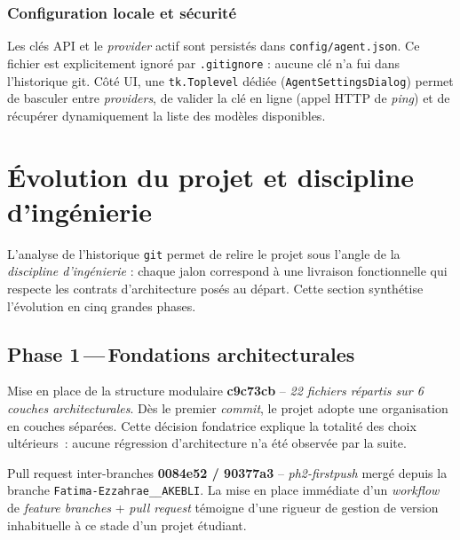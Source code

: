 \documentclass[11pt,a4paper]{report}
\begin{document}
\subsection{Configuration locale et s\'ecurit\'e}

Les cl\'es API et le \textit{provider} actif sont persist\'es dans
\texttt{config/agent.json}. Ce fichier est explicitement ignor\'e
par \texttt{.gitignore} : aucune cl\'e n'a fui dans l'historique
git. C\^ot\'e UI, une \texttt{tk.Toplevel} d\'edi\'ee
(\texttt{AgentSettingsDialog}) permet de basculer entre
\textit{providers}, de valider la cl\'e en ligne (appel HTTP de
\textit{ping}) et de r\'ecup\'erer dynamiquement la liste des
mod\`eles disponibles.

\chapter{\'Evolution du projet et discipline d'ing\'enierie}

L'analyse de l'historique \texttt{git} permet de relire le projet
sous l'angle de la \textit{discipline d'ing\'enierie} : chaque jalon
correspond \`a une livraison fonctionnelle qui respecte les
contrats d'architecture pos\'es au d\'epart. Cette section synth\'etise
l'\'evolution en cinq grandes phases.

\section{Phase 1\,---\,Fondations architecturales}

\begin{milestonebox}{Mise en place de la structure modulaire}
\textbf{c9c73cb} -- \textit{22 fichiers r\'epartis sur 6 couches architecturales}.
D\`es le premier \textit{commit}, le projet adopte une organisation
en couches s\'epar\'ees. Cette d\'ecision fondatrice explique la
totalit\'e des choix ult\'erieurs~: aucune r\'egression d'architecture
n'a \'et\'e observ\'ee par la suite.
\end{milestonebox}

\begin{milestonebox}{Pull request inter-branches}
\textbf{0084e52 / 90377a3} -- \textit{ph2-firstpush} merg\'e depuis
la branche \texttt{Fatima-Ezzahrae\_\_AKEBLI}. La mise en place
imm\'ediate d'un \textit{workflow} de \textit{feature branches} +
\textit{pull request} t\'emoigne d'une rigueur de gestion de version
inhabituelle \`a ce stade d'un projet \'etudiant.
\end{milestonebox}
\end{document}
